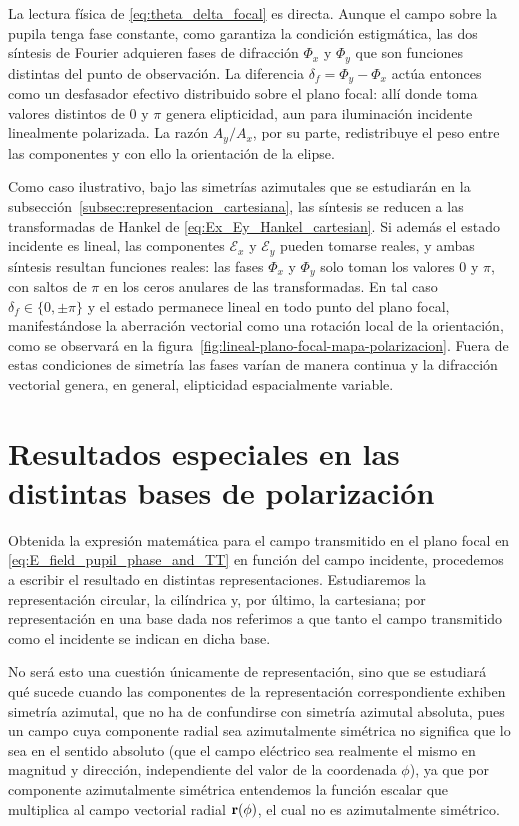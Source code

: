 La lectura física de \eqref{eq:theta_delta_focal} es directa. Aunque el campo
sobre la pupila tenga fase constante, como garantiza la condición
estigmática, las dos síntesis de Fourier adquieren fases de difracción
$\Phi_x$ y $\Phi_y$ que son funciones distintas del punto de observación. La
diferencia $\delta_f=\Phi_y-\Phi_x$ actúa entonces como un desfasador efectivo
distribuido sobre el plano focal: allí donde toma valores distintos de $0$ y
$\pi$ genera elipticidad, aun para iluminación incidente linealmente
polarizada. La razón $A_y/A_x$, por su parte, redistribuye el peso entre las
componentes y con ello la orientación de la elipse.

Como caso ilustrativo, bajo las simetrías azimutales que se estudiarán en la
subsección~\ref{subsec:representacion_cartesiana}, las síntesis se reducen a
las transformadas de Hankel de \eqref{eq:Ex_Ey_Hankel_cartesian}. Si además el
estado incidente es lineal, las componentes $\mathscr E_x$ y $\mathscr E_y$
pueden tomarse reales, y ambas síntesis resultan funciones reales: las fases
$\Phi_x$ y $\Phi_y$ solo toman los valores $0$ y $\pi$, con saltos de $\pi$ en
los ceros anulares de las transformadas. En tal caso $\delta_f\in\{0,\pm\pi\}$
y el estado permanece lineal en todo punto del plano focal, manifestándose la
aberración vectorial como una rotación local de la orientación, como se
observará en la figura~\ref{fig:lineal-plano-focal-mapa-polarizacion}. Fuera de
estas condiciones de simetría las fases varían de manera continua y la
difracción vectorial genera, en general, elipticidad espacialmente variable.

\section{Resultados especiales en las distintas bases de polarización}

Obtenida la expresión matemática para el campo transmitido en el plano focal en \eqref{eq:E_field_pupil_phase_and_TT} en función del campo incidente, procedemos a escribir el resultado en distintas representaciones. Estudiaremos la representación circular, la cilíndrica y, por último, la cartesiana; por representación en una base dada nos referimos a que tanto el campo transmitido como el incidente se indican en dicha base.

No será esto una cuestión únicamente de representación, sino que se estudiará qué sucede cuando las componentes de la representación correspondiente exhiben simetría azimutal,
que no ha de confundirse con simetría azimutal absoluta, pues un campo cuya componente radial sea azimutalmente simétrica no significa que lo sea en el sentido absoluto (que el campo eléctrico sea realmente el mismo en magnitud y dirección, independiente del valor de la coordenada $\phi$), ya que por componente azimutalmente simétrica entendemos la función escalar que multiplica al campo vectorial radial $\vb r(\phi)$, el cual no es azimutalmente simétrico.

